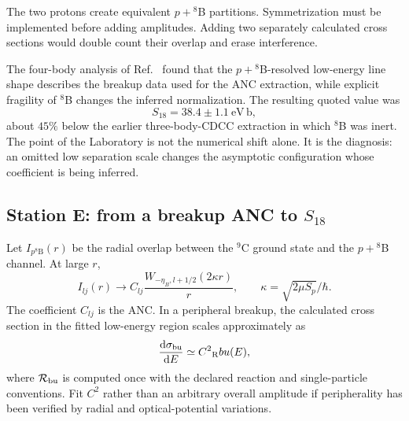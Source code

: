 \begin{warningbox}
The two protons create equivalent $p+{}^8$B partitions.  Symmetrization must
be implemented before adding amplitudes.  Adding two separately calculated
cross sections would double count their overlap and erase interference.
\end{warningbox}

The four-body analysis of Ref.~\cite{Ogawa:2025S18} found that the
$p+{}^8$B-resolved low-energy line shape describes the breakup data used for
the ANC extraction, while explicit fragility of $^8$B changes the inferred
normalization.  The resulting quoted value was
\begin{equation}
  S_{18}=38.4\pm1.1\ \mathrm{eV\,b},
  \label{eq:published-S18}
\end{equation}
about $45\%$ below the earlier three-body-CDCC extraction in which $^8$B was
inert.  The point of the Laboratory is not the numerical shift alone.  It is
the diagnosis: an omitted low separation scale changes the asymptotic
configuration whose coefficient is being inferred.

\subsection{Station E: from a breakup ANC to
\texorpdfstring{$S_{18}$}{S18}}
\label{subsec:lab-anc-s18}

Let $I_{p{}^8\mathrm B}(r)$ be the radial overlap between the $^9$C ground
state and the $p+{}^8$B channel.  At large $r$,
\begin{equation}
  I_{lj}(r)\longrightarrow
  C_{lj}\frac{W_{-\eta_B,l+1/2}(2\kappa r)}{r},
  \qquad
  \kappa=\sqrt{2\mu S_p}/\hbar.
  \label{eq:9c-anc-tail}
\end{equation}
The coefficient $C_{lj}$ is the ANC.  In a peripheral breakup, the calculated
cross section in the fitted low-energy region scales approximately as
\begin{equation}
  \frac{\rmd\vsub{\sigma}{bu}}{\rmd E}
  \simeq C^2\mathcal \vsub{R}{bu}(E),
  \label{eq:breakup-anc-factorization}
\end{equation}
where $\mathcal R_{\mathrm{bu}}$ is computed once with the declared reaction and
single-particle conventions.  Fit $C^2$ rather than an arbitrary overall
amplitude if peripherality has been verified by radial and optical-potential
variations.

